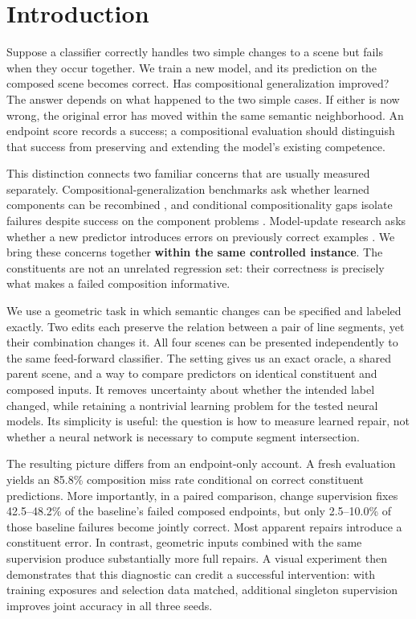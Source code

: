 \hypertarget{introduction}{%
\section{Introduction}\label{introduction}}

Suppose a classifier correctly handles two simple changes to a scene but fails when they occur together. We train a new model, and its prediction on the composed scene becomes correct. Has compositional generalization improved? The answer depends on what happened to the two simple cases. If either is now wrong, the original error has moved within the same semantic neighborhood. An endpoint score records a success; a compositional evaluation should distinguish that success from preserving and extending the model's existing competence.

This distinction connects two familiar concerns that are usually measured separately. Compositional-generalization benchmarks ask whether learned components can be recombined \citep{lake2018generalization, keysers2020measuring}, and conditional compositionality gaps isolate failures despite success on the component problems \citep{press2023measuring}. Model-update research asks whether a new predictor introduces errors on previously correct examples \citep{yan2021positive}. We bring these concerns together \textbf{within the same controlled instance}. The constituents are not an unrelated regression set: their correctness is precisely what makes a failed composition informative.

We use a geometric task in which semantic changes can be specified and labeled exactly. Two edits each preserve the relation between a pair of line segments, yet their combination changes it. All four scenes can be presented independently to the same feed-forward classifier. The setting gives us an exact oracle, a shared parent scene, and a way to compare predictors on identical constituent and composed inputs. It removes uncertainty about whether the intended label changed, while retaining a nontrivial learning problem for the tested neural models. Its simplicity is useful: the question is how to measure learned repair, not whether a neural network is necessary to compute segment intersection.

The resulting picture differs from an endpoint-only account. A fresh evaluation yields an 85.8\% composition miss rate conditional on correct constituent predictions. More importantly, in a paired comparison, change supervision fixes 42.5--48.2\% of the baseline's failed composed endpoints, but only 2.5--10.0\% of those baseline failures become jointly correct. Most apparent repairs introduce a constituent error. In contrast, geometric inputs combined with the same supervision produce substantially more full repairs. A visual experiment then demonstrates that this diagnostic can credit a successful intervention: with training exposures and selection data matched, additional singleton supervision improves joint accuracy in all three seeds.

